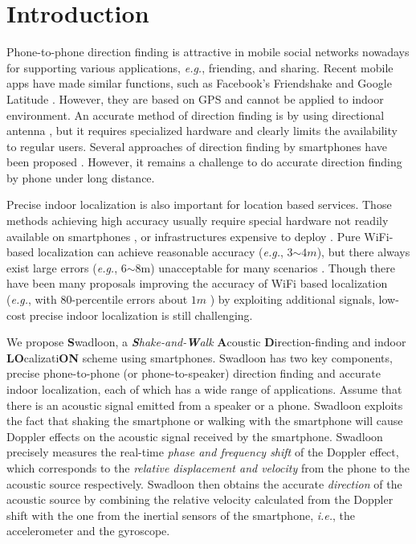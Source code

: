 \documentclass[]{sig-alternate-10pt}
\def\ie{\textit{i.e.}\xspace}
\def\eg{\textit{e.g.}\xspace}
\def \ourprotocol{Swadloon\xspace}
\begin{document}
\section{Introduction}
\label{sec:intro}

Phone-to-phone direction finding is attractive in mobile social
 networks nowadays for supporting various applications, \eg,
 friending, and sharing.
Recent mobile apps have made similar functions, such as
 Facebook's Friendshake \cite{friendshake} and Google Latitude
 \cite{GoogleLatitude}. However, they are based on GPS and cannot be applied
 to indoor environment.  An accurate method of direction finding is by
 using directional antenna
\cite{4711074,4509717,Niculescu:2004:VBS:1023720.1023727},
but it requires specialized hardware and clearly limits the
availability to regular users. Several approaches of direction
finding by smartphones have been proposed
\cite{2011-MOBICOM-Iamantenna,2012-MobiQuitous2011-ProposalDirectionEstimation,2011-SenSys-feasibilityrealtime}. However,
it  remains a challenge to do accurate direction finding by phone
 under long distance.

Precise indoor localization is also important for location based
 services.
Those methods achieving high accuracy usually require special hardware
 not readily available on smartphones
\cite{6071927}, or infrastructures
 expensive to deploy
 \cite{DBLP:journals/tsmc/LiuDBL07}.
Pure WiFi-based localization can achieve reasonable accuracy (\eg,
 3$\sim$$4m$), but there always exist large errors (\eg, 6$\sim$8m)
 unacceptable for many scenarios  \cite{2012-MOBICOM-PushlimitWiFi}.
Though there have  been many proposals  improving the accuracy of WiFi
 based localization (\eg, with $80$-percentile errors about $1m$
 \cite{2012-MOBICOM-PushlimitWiFi}) by exploiting additional signals,
 low-cost precise indoor localization is still  challenging.


We propose \textbf \ourprotocol, a
\emph{\textbf{S}hake-and-\textbf{W}alk} \textbf{A}coustic
 \textbf{D}irection-finding and indoor \textbf{LO}calizati\textbf{ON}
 scheme using smartphones.
\ourprotocol has two key components, precise phone-to-phone
 (or phone-to-speaker) direction finding and
 accurate indoor localization, each of which has a wide range of
 applications.
Assume that there is an acoustic signal emitted from a speaker or a
 phone.
\ourprotocol exploits the fact that  shaking the smartphone or walking with
 the smartphone  will cause Doppler effects on the
  acoustic signal received by the smartphone.
\ourprotocol  precisely measures
 the real-time \textit{phase and frequency shift} of the Doppler effect, which
 corresponds to the \textit{relative displacement and velocity} from the phone to the
 acoustic source respectively.
\ourprotocol then obtains the accurate \textit{direction} of the
 acoustic source by combining the relative velocity calculated from the
 Doppler shift with the one from the  inertial sensors of the
 smartphone, \ie, the accelerometer and the gyroscope.
\end{document}
